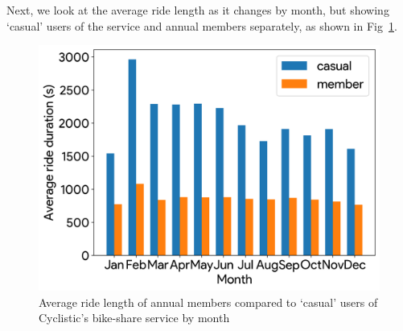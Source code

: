 \documentclass{article}
\begin{document}

Next, we look at the average ride length as it changes by month, but showing `casual' users of the service and annual members separately, as shown in Fig~\ref{fig:ride_mem_month}.

\begin{figure}
  \centering
  \includegraphics[width=\textwidth]{figs/ride_mem_month}
  \caption{Average ride length of annual members compared to `casual' users of Cyclistic's bike-share service by month}
  \label{fig:ride_mem_month}
\end{figure}
\end{document}

